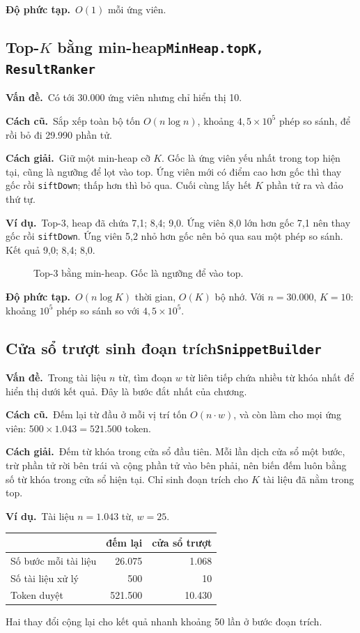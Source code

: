 \documentclass[9pt,twocolumn,a4paper]{extarticle}
\newcommand{\code}[1]{\texttt{#1}}
\newcommand{\dsa}[2]{\subsection[#1]{#1\hfill{\normalfont\footnotesize\code{#2}}}}
\newcommand{\vande}{\textcolor{linkblue}{\textbf{Vấn đề.}}~}
\newcommand{\cachgiai}{\textcolor{linkblue}{\textbf{Cách giải.}}~}
\newcommand{\dpt}{\textcolor{linkblue}{\textbf{Độ phức tạp.}}~}
\newcommand{\cu}{\textcolor{linkblue}{\textbf{Cách cũ.}}~}
\newcommand{\vidu}{\textcolor{linkblue}{\textbf{Ví dụ.}}~}
\begin{document}
\dpt $O(1)$ mỗi ứng viên.

\dsa{Top-$K$ bằng min-heap}{MinHeap.topK, ResultRanker}
\vande Có tới 30.000 ứng viên nhưng chỉ hiển thị 10.

\cu Sắp xếp toàn bộ tốn $O(n\log n)$, khoảng $4{,}5\times10^5$ phép so sánh, để rồi bỏ đi 29.990 phần tử.

\cachgiai Giữ một min-heap cỡ $K$. Gốc là ứng viên yếu nhất trong top hiện tại, cũng là ngưỡng để lọt vào top. Ứng viên mới có điểm cao hơn gốc thì thay gốc rồi \code{siftDown}; thấp hơn thì bỏ qua. Cuối cùng lấy hết $K$ phần tử ra và đảo thứ tự.

\vidu Top-3, heap đã chứa 7,1; 8,4; 9,0. Ứng viên 8,0 lớn hơn gốc 7,1 nên thay gốc rồi \code{siftDown}. Ứng viên 5,2 nhỏ hơn gốc nên bỏ qua sau một phép so sánh. Kết quả 9,0; 8,4; 8,0.

\begin{figure}[H]
\centering
{}
\caption{Top-3 bằng min-heap. Gốc là ngưỡng để vào top.}
\label{fig:topk}
\end{figure}

\dpt $O(n\log K)$ thời gian, $O(K)$ bộ nhớ. Với $n=30.000$, $K=10$: khoảng $10^5$ phép so sánh so với $4{,}5\times10^5$.

\dsa{Cửa sổ trượt sinh đoạn trích}{SnippetBuilder}
\vande Trong tài liệu $n$ từ, tìm đoạn $w$ từ liên tiếp chứa nhiều từ khóa nhất để hiển thị dưới kết quả. Đây là bước đắt nhất của chương.

\cu Đếm lại từ đầu ở mỗi vị trí tốn $O(n\cdot w)$, và còn làm cho mọi ứng viên: $500\times1.043=521.500$ token.

\cachgiai Đếm từ khóa trong cửa sổ đầu tiên. Mỗi lần dịch cửa sổ một bước, trừ phần tử rời bên trái và cộng phần tử vào bên phải, nên biến đếm luôn bằng số từ khóa trong cửa sổ hiện tại. Chỉ sinh đoạn trích cho $K$ tài liệu đã nằm trong top.

\vidu Tài liệu $n=1.043$ từ, $w=25$.
\begin{center}\footnotesize
\begin{tabular}{@{}lrr@{}}
\toprule
& đếm lại & cửa sổ trượt \\
\midrule
Số bước mỗi tài liệu & 26.075 & 1.068 \\
Số tài liệu xử lý & 500 & 10 \\
Token duyệt & 521.500 & 10.430 \\
\bottomrule
\end{tabular}
\end{center}
Hai thay đổi cộng lại cho kết quả nhanh khoảng 50 lần ở bước đoạn trích.
\end{document}

